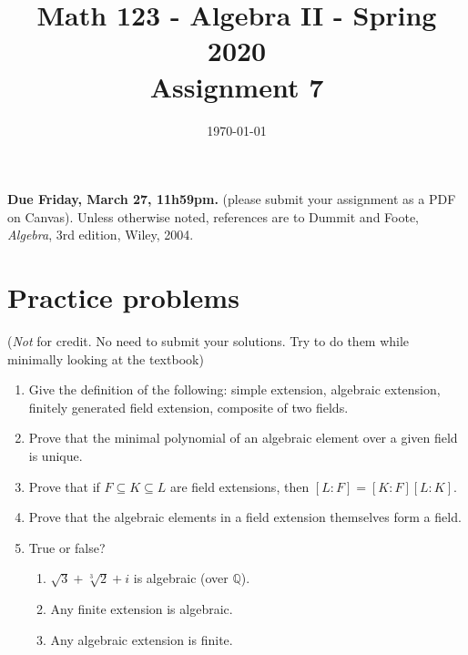 \documentclass{amsart}
\title[Math 123, Spring 2020: assignment 7]{Math 123 - Algebra II - Spring 2020 \\ Assignment 7}
\date{\today}
\theoremstyle{definition}
\newcommand{\Qq}{\mathbb{Q}}
\begin{document}

\vspace*{-10em}
\maketitle

\textbf{Due Friday, March 27, 11h59pm.} (please submit your assignment as a PDF on Canvas). Unless otherwise noted, references are to Dummit and Foote, \emph{Algebra}, 3rd edition, Wiley, 2004.

\section*{Practice problems} (\emph{Not} for credit. No need to submit your solutions. Try to do them while minimally looking at the textbook)

\begin{enumerate}
\item Give the definition of the following: simple extension, algebraic extension, finitely generated field extension, composite of two fields. 
\item Prove that the minimal polynomial of an algebraic element over a given field is unique.
\item Prove that if $F \subseteq K \subseteq L$ are field extensions, then $[L : F] = [K : F] [L : K]$.
\item Prove that the algebraic elements in a field extension themselves form a field.
\item True or false?
  \begin{enumerate}
  \item $\sqrt{3} + \sqrt[3]{2} + i$ is algebraic (over $\Qq$).
  \item Any finite extension is algebraic.
  \item Any algebraic extension is finite.
  \end{enumerate}
\end{enumerate}
\end{document}
